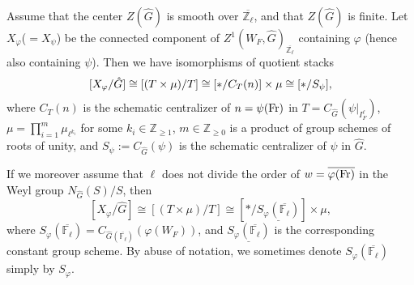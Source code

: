 \begin{theorem}\label{Thm X/G}
	Assume that the center $Z(\hat{G})$ is smooth over $\overline{\mathbb{Z}_{\ell}}$, and that $Z(\hat{G})$ is finite.
	Let $X_{\varphi}$($=X_{\psi}$) be the connected component of $Z^1(W_F, \hat{G})_{\overline{\mathbb{Z}_{\ell}}}$ containing $\varphi$ (hence also containing $\psi$). Then we have isomorphisms of quotient stacks
	\begin{equation}\label{Equation: X_phi}
		[X_{\varphi}/\hat{G}] \cong [(T \times \mu)/T] \cong [*/{C_T(n)}] \times \mu \cong [*/S_{\psi}] \time \mu,
	\end{equation}
	where $C_T(n)$ is the schematic centralizer of $n=\psi(\operatorname{Fr})$ in $T=C_{\hat{G}}(\psi|_{I_F^{\ell}})$, $\mu=\prod_{i=1}^m\mu_{\ell^{k_i}}$ for some $k_i \in \mathbb{Z}_{\geq 1}$, $m \in \mathbb{Z}_{\geq 0}$ is a product of group schemes of roots of unity, and $S_{\psi}:=C_{\hat{G}}(\psi)$ is the schematic centralizer of $\psi$ in $\hat{G}$. 
	
	If we moreover assume that
    $\ell$ does not divide the order of $w=\overline{\varphi(\operatorname{Fr})}$ in the Weyl group $N_{\hat{G}}(S)/S$,
	then 
	$$[X_{\varphi}/\hat{G}] \cong [(T \times \mu)/T] \cong [*/\underline{S_{\varphi}(\overline{\mathbb{F}_{\ell}})}] \times \mu,$$
	where $S_{\varphi}(\overline{\mathbb{F}_{\ell}})=C_{\hat{G}(\overline{\mathbb{F}_{\ell}})}(\varphi(W_F))$, and $\underline{S_{\varphi}(\overline{\mathbb{F}_{\ell}})}$ is the corresponding constant group scheme. By abuse of notation, we sometimes denote $S_{\varphi}(\overline{\mathbb{F}_{\ell}})$ simply by $S_{\varphi}$.
\end{theorem}

